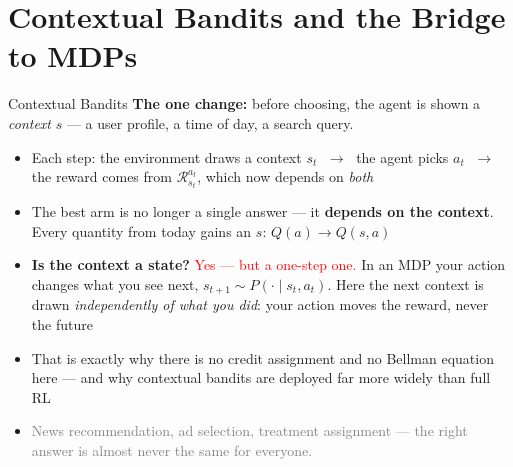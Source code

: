 \section{Contextual Bandits and the Bridge to MDPs}

\begin{frame}{Contextual Bandits}
\textbf{The one change:} before choosing, the agent is shown a \emph{context} $s$ --- a user profile, a time of day, a search query.
\vspace{0.4em}
\begin{itemize}
    \setlength{\itemsep}{0.5em}
    \item Each step: the environment draws a context $s_t$ $\;\to\;$ the agent picks $a_t$ $\;\to\;$ the reward comes from $\mathcal{R}^{a_t}_{s_t}$, which now depends on \emph{both}
    \item The best arm is no longer a single answer --- it \textbf{depends on the context}. Every quantity from today gains an $s$: $Q(a) \to Q(s,a)$
    \item \textbf{Is the context a state?} \textcolor{red}{Yes --- but a one-step one.} In an MDP your action changes what you see next, $s_{t+1} \sim P(\cdot \mid s_t, a_t)$. Here the next context is drawn \emph{independently of what you did}: your action moves the reward, never the future
    \item That is exactly why there is no credit assignment and no Bellman equation here --- and why contextual bandits are deployed far more widely than full RL
    \item \textcolor{gray}{News recommendation, ad selection, treatment assignment --- the right answer is almost never the same for everyone.}
\end{itemize}
\end{frame}

